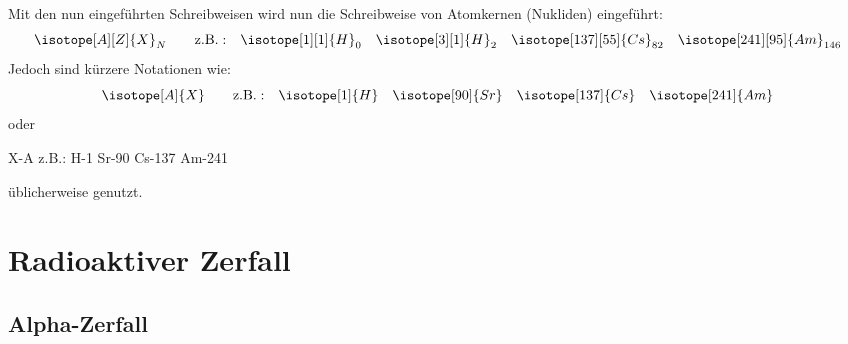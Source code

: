 \documentclass[../protokoll.tex]{subfiles}
\begin{document}
Mit den nun eingeführten Schreibweisen wird nun die Schreibweise von Atomkernen
(Nukliden) eingeführt:
\begin{equation*}
    \isotope[A][Z]{X}_N \qquad \mathrm{z.B.:} \quad 
    \isotope[1][1]{H}_0 \quad 
    \isotope[3][1]{H}_2 \quad
    \isotope[137][55]{Cs}_{82} \quad
    \isotope[241][95]{Am}_{146}
\end{equation*}
Jedoch sind kürzere Notationen wie:
\begin{equation*}
    \isotope[A]{X} \qquad \mathrm{z.B.:} \quad
    \isotope[1]{H} \quad 
    \isotope[90]{Sr} \quad
    \isotope[137]{Cs} \quad
    \isotope[241]{Am}
\end{equation*}
oder
\begin{center}
    X-A \qquad z.B.: \quad
    H-1 \quad
    Sr-90 \quad
    Cs-137 \quad
    Am-241
\end{center}
üblicherweise genutzt.
\newpage
\section{Radioaktiver Zerfall}
\subsection{Alpha-Zerfall}
\end{document}
